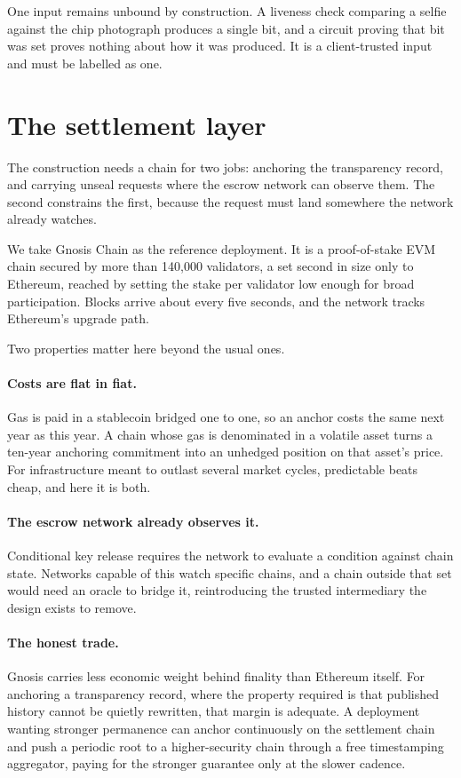 \documentclass[11pt,a4paper]{article}
\begin{document}
One input remains unbound by construction. A liveness check comparing a selfie
against the chip photograph produces a single bit, and a circuit proving that bit
was set proves nothing about how it was produced. It is a client-trusted input
and must be labelled as one.

\section{The settlement layer}

The construction needs a chain for two jobs: anchoring the transparency record,
and carrying unseal requests where the escrow network can observe them. The
second constrains the first, because the request must land somewhere the network
already watches.

We take Gnosis Chain as the reference deployment. It is a proof-of-stake EVM
chain secured by more than 140{,}000 validators, a set second in size only to
Ethereum, reached by setting the stake per validator low enough for broad
participation. Blocks arrive about every five seconds, and the network tracks
Ethereum's upgrade path.

Two properties matter here beyond the usual ones.

\paragraph{Costs are flat in fiat.} Gas is paid in a stablecoin bridged one to
one, so an anchor costs the same next year as this year. A chain whose gas is
denominated in a volatile asset turns a ten-year anchoring commitment into an
unhedged position on that asset's price. For infrastructure meant to outlast
several market cycles, predictable beats cheap, and here it is both.

\paragraph{The escrow network already observes it.} Conditional key release
requires the network to evaluate a condition against chain state. Networks
capable of this watch specific chains, and a chain outside that set would need an
oracle to bridge it, reintroducing the trusted intermediary the design exists to
remove.

\paragraph{The honest trade.} Gnosis carries less economic weight behind finality
than Ethereum itself. For anchoring a transparency record, where the property
required is that published history cannot be quietly rewritten, that margin is
adequate. A deployment wanting stronger permanence can anchor continuously on the
settlement chain and push a periodic root to a higher-security chain through a
free timestamping aggregator, paying for the stronger guarantee only at the
slower cadence.
\end{document}
